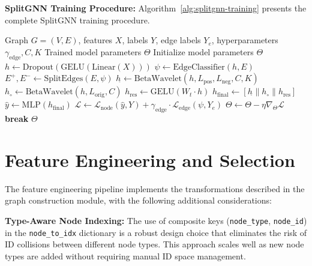 \textbf{SplitGNN Training Procedure:} Algorithm~\ref{alg:splitgnn-training} presents the complete SplitGNN training procedure.

\begin{algorithm}[H]
\caption{SplitGNN Training}
\label{alg:splitgnn-training}
\begin{algorithmic}[1]
\REQUIRE Graph $G = (V, E)$, features $X$, labels $Y$, edge labels $Y_e$, hyperparameters $\gamma_{\text{edge}}, C, K$
\ENSURE Trained model parameters $\Theta$
\STATE Initialize model parameters $\Theta$
    \STATE $h \leftarrow \text{Dropout}(\text{GELU}(\text{Linear}(X)))$ 
    \STATE $\psi \leftarrow \text{EdgeClassifier}(h, E)$ 
    \STATE $E^+, E^- \leftarrow \text{SplitEdges}(E, \psi)$ 
    \STATE $h_{\hat{}} \leftarrow \text{BetaWavelet}(h, L_{\text{pos}}, L_{\text{neg}}, C, K)$ 
    \STATE $h_{\circ} \leftarrow \text{BetaWavelet}(h, L_{\text{orig}}, C)$ 
    \STATE $h_{\text{res}} \leftarrow \text{GELU}(W_t \cdot h)$ 
    \STATE $h_{\text{final}} \leftarrow [h_{\hat{}} \| h_{\circ} \| h_{\text{res}}]$ 
    \STATE $\hat{y} \leftarrow \text{MLP}(h_{\text{final}})$ 
    \STATE $\mathcal{L} \leftarrow \mathcal{L}_{\text{node}}(\hat{y}, Y) + \gamma_{\text{edge}} \cdot \mathcal{L}_{\text{edge}}(\psi, Y_e)$ 
    \STATE $\Theta \leftarrow \Theta - \eta \nabla_\Theta \mathcal{L}$ 
        \STATE \textbf{break}
    \ENDIF
\ENDFOR
\RETURN $\Theta$
\end{algorithmic}
\end{algorithm}

\section{Feature Engineering and Selection}

The feature engineering pipeline implements the transformations described in the graph construction module, with the following additional considerations:

\textbf{Type-Aware Node Indexing:} The use of composite keys (\texttt{node\_type}, \texttt{node\_id}) in the \texttt{node\_to\_idx} dictionary is a robust design choice that eliminates the risk of ID collisions between different node types. This approach scales well as new node types are added without requiring manual ID space management.

